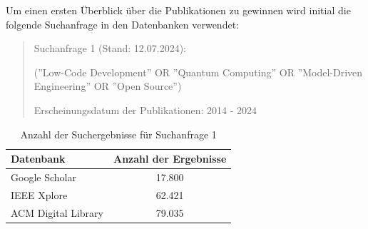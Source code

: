 
Um einen ersten Überblick über die Publikationen zu gewinnen wird initial die folgende Suchanfrage in den Datenbanken verwendet:

\begin{quote}
    Suchanfrage 1 (Stand: 12.07.2024):

    (''Low-Code Development'' OR ''Quantum Computing'' OR ''Model-Driven Engineering'' OR ''Open Source'')

    Erscheinungsdatum der Publikationen: 2014 - 2024
\end{quote}

\begin{table}[h!]
    \centering
    \caption{Anzahl der Suchergebnisse für Suchanfrage 1}
    \label{tab:search_1_results}
    \begin{tabular}{|l|c|}
    \hline
    \textbf{Datenbank} & \textbf{Anzahl der Ergebnisse} \\ \hline
    Google Scholar & 17.800 \\ \hline
    IEEE Xplore & 62.421 \\ \hline
    ACM Digital Library & 79.035 \\ \hline
    \end{tabular}
\end{table}
    
